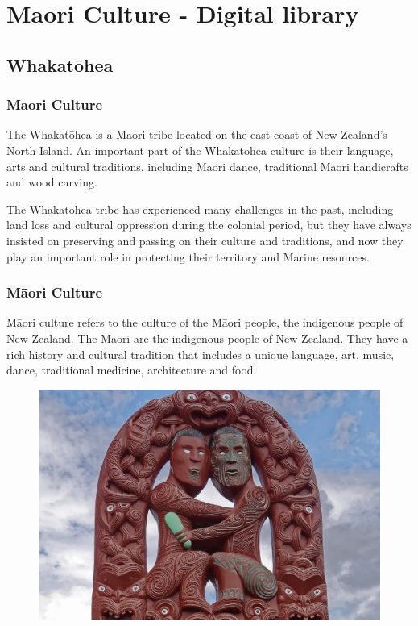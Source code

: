 \chapter{Maori Culture - Digital library}

\section{Whakatōhea}

\subsection{Maori Culture}
The Whakatōhea is a Maori tribe located on the east coast of New Zealand's North Island. An important part of the Whakatōhea culture is their language, arts and cultural traditions, including Maori dance, traditional Maori handicrafts and wood carving.

The Whakatōhea tribe has experienced many challenges in the past, including land loss and cultural oppression during the colonial period, but they have always insisted on preserving and passing on their culture and traditions, and now they play an important role in protecting their territory and Marine resources.

\subsection{Māori Culture}
Māori culture refers to the culture of the Māori people, the indigenous people of New Zealand. The Māori are the indigenous people of New Zealand. They have a rich history and cultural tradition that includes a unique language, art, music, dance, traditional medicine, architecture and food.

\begin{figure}[htbp]
  \centerline{\includegraphics[width=500pt]{images/M1-1.png}}
\end{figure}

